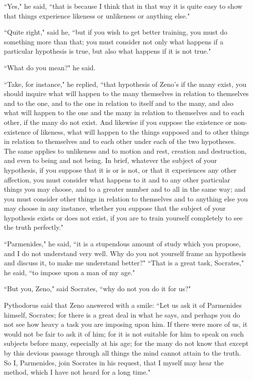\documentclass[letterpaper,12pt]{article}
\newcommand{\stephpag}[1]{\marginnote{\small\itshape\fontfamily{ppl}\selectfont #1}}
\begin{document}
``Yes," he said, ``that is because I think that in that way it is quite easy to show that things experience likeness or unlikeness or anything else."

``Quite right," said he, ``but if you wish to get better training, you must do something more than that; \stephpag{136 a} you must consider not only what happens if a particular hypothesis is true, but also what happens if it is not true."

``What do you mean?" he said.

``Take, for instance," he replied, ``that hypothesis of Zeno's if the many exist, you should inquire what will happen to the many themselves in relation to themselves and to the one, and to the one in relation to itself and to the many, and also what will happen to the one and the many in relation to themselves and to each other, if the many do not exist. \stephpag{b} And likewise if you suppose the existence or non-existence of likeness, what will happen to the things supposed and to other things in relation to themselves and to each other under each of the two hypotheses. The same applies to unlikeness and to motion and rest, creation and destruction, and even to being and not being. In brief, whatever the subject of your hypothesis, if you suppose that it is or is not, or that it experiences any other affection, you must consider what happens to it and to any other particular things you may choose, and to a greater number and to all in the same way; \stephpag{c} and you must consider other things in relation to themselves and to anything else you may choose in any instance, whether you suppose that the subject of your hypothesis exists or does not exist, if you are to train yourself completely to see the truth perfectly."

``Parmenides," he said, ``it is a stupendous amount of study which you propose, and I do not understand very well. Why do you not yourself frame an hypothesis and discuss it, to make me understand better?" \stephpag{d} ``That is a great task, Socrates," he said, ``to impose upon a man of my age."

``But you, Zeno," said Socrates, ``why do not you do it for us?"

Pythodorus said that Zeno answered with a smile: ``Let us ask it of Parmenides himself, Socrates; for there is a great deal in what he says, and perhaps you do not see how heavy a task you are imposing upon him. If there were more of us, it would not be fair to ask it of him; for it is not suitable for him to speak on such subjects before many, especially at his age; \stephpag{e} for the many do not know that except by this devious passage through all things the mind cannot attain to the truth. So I, Parmenides, join Socrates in his request, that I myself may hear the method, which I have not heard for a long time."
\end{document}

